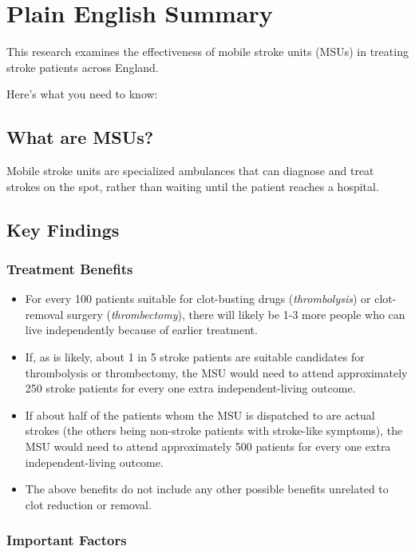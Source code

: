 \section*{Plain English Summary}

This research examines the effectiveness of mobile stroke units (MSUs) in treating stroke patients across England. 

Here's what you need to know:

\subsection*{What are MSUs?}
Mobile stroke units are specialized ambulances that can diagnose and treat strokes on the spot, rather than waiting until the patient reaches a hospital.

\subsection*{Key Findings}

\subsubsection*{Treatment Benefits}

\begin{itemize}
    \item For every 100 patients suitable for clot-busting drugs (\textit{thrombolysis}) or clot-removal surgery (\textit{thrombectomy}), there will likely be 1-3 more people who can live independently because of earlier treatment.
    \item If, as is likely, about 1 in 5 stroke patients are suitable candidates for thrombolysis or thrombectomy, the MSU would need to attend approximately 250 stroke patients for every one extra independent-living outcome.
    \item If about half of the patients whom the MSU is dispatched to are actual strokes (the others being non-stroke patients with stroke-like symptoms), the MSU would need to attend approximately 500 patients for every one extra independent-living outcome.
    \item The above benefits do not include any other possible benefits unrelated to clot reduction or removal.
\end{itemize}

\subsubsection*{Important Factors}

